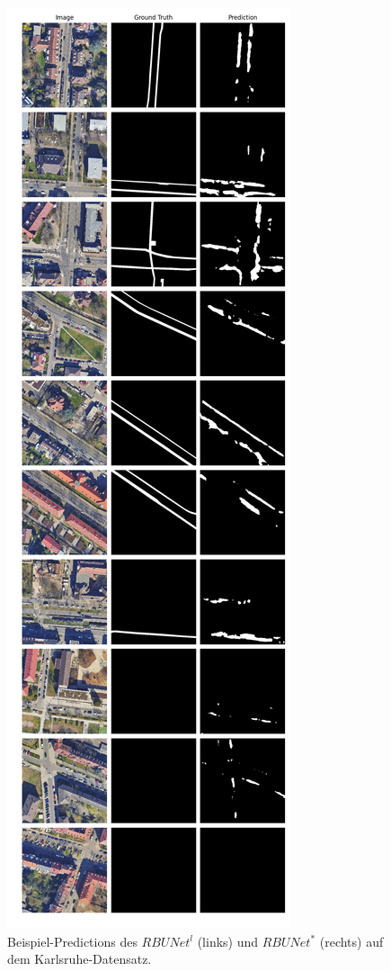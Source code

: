 \begin{figure}
\begin{minipage}{.41\textwidth}
	\end{minipage}
	\begin{minipage}{.41\textwidth}
		\centering
		\includegraphics[width=1.\linewidth]{Bilder/Samples-KA/rbunet-s.png}
	\end{minipage}

	\caption{Beispiel-Predictions des $RBUNet^l$ (links) und $RBUNet^*$ (rechts) auf dem Karlsruhe-Datensatz.}
	\label{fig:ka-samples-rbunet-l-rbunet-s}
\end{figure}


